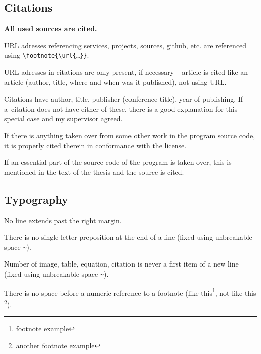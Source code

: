 \subsection*{Citations}
\begin{checklist}
	\item \bf All used sources are cited. \rm
	\item URL adresses referencing services, projects, sources, github, etc. are referenced using \verb|\footnote{\url{…}}|.
    \item URL adresses in citations are only present, if necessary – article is cited like an article (author, title, where and when was it published), not using URL.
    \item Citations have author, title, publisher (conference title), year of publishing. If a~citation does not have either of these, there is a good explanation for this special case and my supervisor agreed.
    \item If there is anything taken over from some other work in the program source code, it is properly cited therein in conformance with the license.
	\item If an essential part of the source code of the program is taken over, this is mentioned in the text of the thesis and the source is cited.
\end{checklist}

\subsection*{Typography}
\begin{checklist}
	\item No line extends past the right margin.
    \item There is no single-letter preposition at the end of a line (fixed using unbreakable space \verb|~|).
    \item Number of image, table, equation, citation is never a first item of a new line (fixed using unbreakable space \verb|~|).
    \item There is no space before a numeric reference to a footnote (like this\footnote{footnote example}, not like this \footnote{another footnote example}).
\end{checklist}

